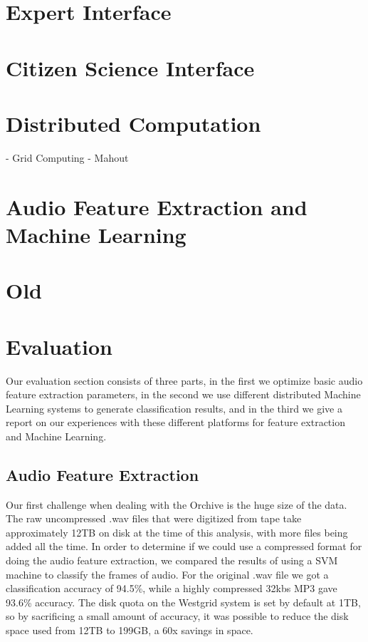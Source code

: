 \label{chapter:evaluation}

\section{Expert Interface}



\section{Citizen Science Interface}


\section{Distributed Computation}

- Grid Computing
- Mahout


\section{Audio Feature Extraction and Machine Learning}








\section{Old}

\section{Evaluation}

Our evaluation section consists of three parts, in the first we
optimize basic audio feature extraction parameters, in the second we
use different distributed Machine Learning systems to generate
classification results, and in the third we give a report on our
experiences with these different platforms for feature extraction and
Machine Learning.

\subsection{Audio Feature Extraction}

Our first challenge when dealing with the Orchive is the huge size of
the data.  The raw uncompressed .wav files that were digitized from
tape take approximately 12TB on disk at the time of this analysis,
with more files being added all the time.  In order to determine if we
could use a compressed format for doing the audio feature extraction,
we compared the results of using a SVM machine to classify the frames
of audio.  For the original .wav file we got a classification accuracy
of 94.5\%, while a highly compressed 32kbs MP3 gave 93.6\% accuracy.
The disk quota on the Westgrid system is set by default at 1TB, so by
sacrificing a small amount of accuracy, it was possible to reduce the
disk space used from 12TB to 199GB, a 60x savings in space.

